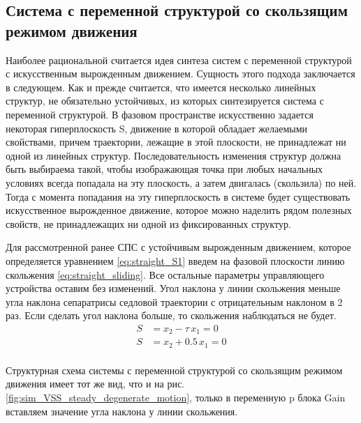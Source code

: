 \clearpage
\subsection{Система с переменной структурой  со скользящим режимом движения} \label{title:VSS_SDM}
Наиболее рациональной считается идея синтеза систем с переменной структурой с искусственным вырожденным движением. Сущность этого подхода заключается в следующем. Как и прежде считается, что имеется несколько линейных структур, не обязательно  устойчивых, из которых синтезируется система с переменной структурой. В фазовом пространстве искусственно задается  некоторая  гиперплоскость S, движение в которой обладает желаемыми свойствами, причем траектории, лежащие  в этой плоскости, не принадлежат ни одной из линейных структур. Последовательность изменения структур должна быть выбираема такой, чтобы изображающая  точка при любых начальных условиях всегда попадала на эту плоскость, а затем двигалась (скользила) по ней. Тогда с момента попадания  на эту гиперплоскость в системе будет существовать искусственное вырожденное движение, которое можно наделить рядом полезных свойств, не принадлежащих ни одной из фиксированных структур. 

Для рассмотренной ранее СПС с устойчивым вырожденным движением, которое определяется уравнением  \eqref{eq:straight_S1} введем на фазовой плоскости линию скольжения  \eqref{eq:straight_sliding}. Все остальные параметры управляющего устройства  оставим без изменений.
 Угол наклона у линии скольжения меньше угла наклона сепаратрисы седловой траектории с отрицательным наклоном в 2 раз. Если сделать угол наклона больше, то скольжения наблюдаться не будет.
\begin{equation}
    \begin{aligned} \label{eq:straight_sliding}
       S&=x_2-\tau\,x_1=0\\
       S&=x_2+0.5\,x_1=0\\
    \end{aligned}
\end{equation}

Структурная схема системы с переменной структурой со скользящим режимом движения имеет тот же вид, что и на рис.\ref{fig:sim_VSS_steady_degenerate_motion}, только в переменную p блока Gain вставляем значение угла наклона у линии скольжения.

